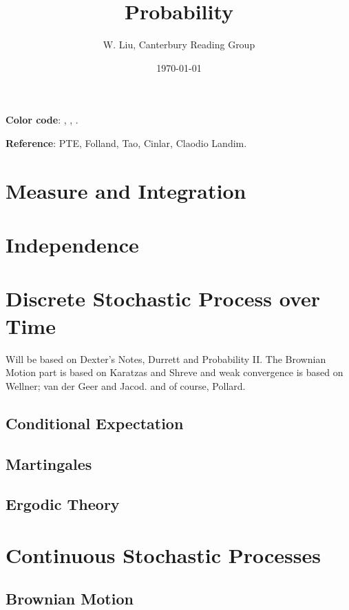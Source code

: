 \documentclass[12pt, oneside]{book}
\begin{document}
    \title{Probability}\author{W. Liu, Canterbury Reading Group}\date{\today}
    \maketitle
    \setcounter{tocdepth}{3}
    \tableofcontents

    \textbf{Color code}: , , . 

    \textbf{Reference}: PTE, Folland, Tao, Cinlar, Claodio Landim.
    \chapter{Measure and Integration}
    \chapter{Independence}
    \chapter{Discrete Stochastic Process over Time}
        Will be based on Dexter's Notes, Durrett and Probability II. The Brownian Motion part is based on Karatzas and Shreve and weak convergence is based on Wellner; van der Geer and Jacod. and of course, Pollard. 
        \section{Conditional Expectation}
    \section{Martingales}
        
        \section{Ergodic Theory}
    
    \chapter{Continuous Stochastic Processes}
        \section{Brownian Motion}
\end{document}
